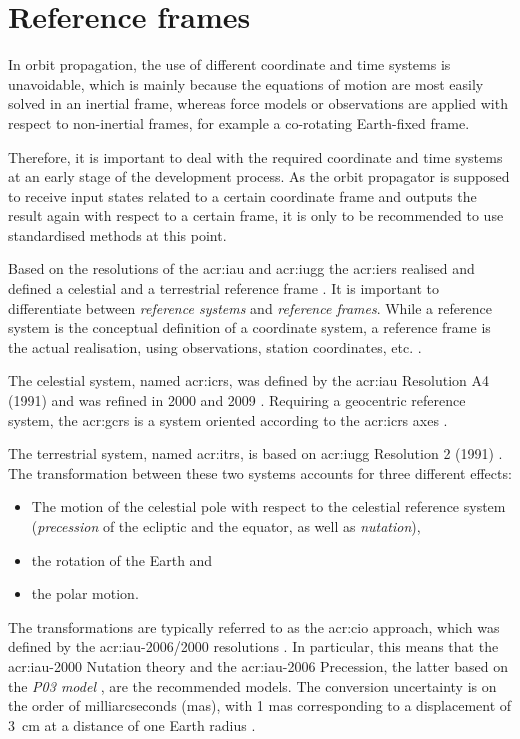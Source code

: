 \section{Reference frames}
\label{sec:propagation-coordinates}

In orbit propagation, the use of different coordinate and time systems is unavoidable, which is mainly because the equations of motion are most easily solved in an 
inertial frame, whereas force models or observations are applied with respect to non-inertial frames, for example a co-rotating Earth-fixed frame.

Therefore, it is important to deal with the required coordinate and time systems at an early stage of the development process. As the orbit propagator is supposed to 
receive input states related to a certain coordinate frame and outputs the result again with respect to a certain frame, it is only to be recommended to use 
standardised methods at this point.

Based on the resolutions of the \gls{acr:iau} and \gls{acr:iugg} the \gls{acr:iers} realised and defined a celestial and a terrestrial reference frame \citep{luzum2010}. 
It is important to differentiate between \textit{reference systems} and \textit{reference frames}. While a reference system is the conceptual definition of a 
coordinate system, a reference frame is the actual realisation, using observations, station coordinates, etc. \citep{seidelmann2006}.

The celestial system, named \gls{acr:icrs},  was defined by the \gls{acr:iau} Resolution A4 (1991) and was refined in 2000 and 2009 \citep{luzum2010}. Requiring a geocentric 
reference system, the \gls{acr:gcrs} is a system oriented according to the \gls{acr:icrs} axes \citep{luzum2010}.

The terrestrial system, named \gls{acr:itrs}, is based on \gls{acr:iugg} Resolution 2 (1991) \citep{luzum2010}. The transformation between these two systems accounts for three 
different effects:
\begin{itemize}
 \item The motion of the celestial pole with respect to the celestial reference system (\textit{precession} of the ecliptic and the equator, as well as \textit{nutation}),
 \item the rotation of the Earth and
 \item the polar motion.
\end{itemize}
The transformations are typically referred to as the \gls{acr:cio} approach, which was defined by the \acrshort{acr:iau}-2006/2000 resolutions \citep{vallado2013}. In particular, 
this means that the \acrshort{acr:iau}-2000 Nutation theory and the \acrshort{acr:iau}-2006 Precession, the latter based on the \textit{P03 model} \citep{capitaine2003, wallace2006}, 
are the recommended models. The conversion uncertainty is on the order of milliarcseconds (mas), with 1 mas corresponding to a displacement of \SI{3}{\centi\metre} at
a distance of one Earth radius \citep{coppola2009}.

